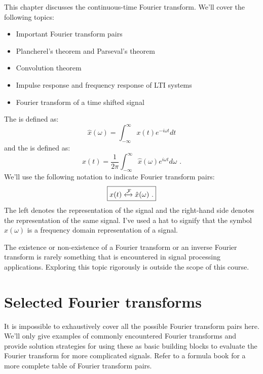 This chapter discusses the continuous-time Fourier transform. We'll cover the following topics:
\begin{itemize}
    \item Important Fourier transform pairs
    \item Plancherel's theorem and Parseval's theorem 
    \item Convolution theorem
    \item Impulse response and frequency response of LTI systems
    \item Fourier transform of a time shifted signal
\end{itemize}

\noindent The \emph{} is defined as:
\begin{equation}
\boxed{
\hat{x}(\omega) = \int_{-\infty}^{\infty} x(t) e^{-i\omega t}dt}
\end{equation}
and the \emph{} is defined as:
\begin{equation}
\boxed{
x(t) = \frac{1}{2\pi}\int_{-\infty}^{\infty} \hat{x}(\omega) e^{i\omega t}d\omega\,\,.
}
\end{equation}
We'll use the following notation to indicate Fourier transform pairs:
\begin{equation}
\boxed{x(t) \xleftrightarrow{\mathcal{F}} \hat{x}(\omega)\,\,.}
\end{equation}
The left denotes the \emph{} representation of the signal and the right-hand side denotes the \emph{} representation of the same signal. 
I've used a hat to signify that the symbol $\hat{x}(\omega)$ is a frequency domain representation of a signal.

The existence or non-existence of a Fourier transform or an inverse Fourier transform is rarely something that is encountered in signal processing applications. Exploring this topic rigorously is outside the scope of this course.

\section{Selected Fourier transforms}
It is impossible to exhaustively cover all the possible Fourier transform pairs here. We'll only give examples of commonly encountered Fourier transforms and provide solution strategies for using these as basic building blocks to evaluate the Fourier transform for more complicated signals. Refer to a formula book\cite{kammler2007first} for a more complete table of Fourier transform pairs.


